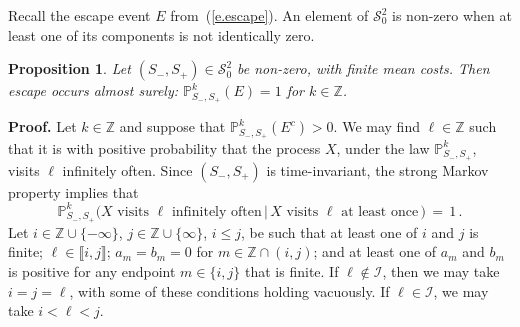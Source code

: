 \documentclass[letterpaper,11pt,oneside,reqno]{amsbook}
\newcommand{\PP}{\ensuremath{\mathbb{P}}}
\newcommand{\Z}{\ensuremath{\mathbb{Z}}}
\numberwithin{figure}{chapter}
\newtheorem{proposition}[theorem]{Proposition}
\theoremstyle{definition}
\theoremstyle{definition}
\theoremstyle{definition}
\theoremstyle{definition}
\theoremstyle{definition}
\newcommand{\mc}{\mathcal}
\newcommand{\tis}{\mc{S}_0}
\newcommand\pgameplay[3]{\PP^{#3}_{#1,#2}}
\begin{document}
Recall the escape event $E$ from~(\ref{e.escape}). An element of $\mc{S}_0^2$ is non-zero when at least one of its components is not identically zero. 
\begin{proposition}\label{p.fmc}
Let $(S_-,S_+) \in \tis^2$ be non-zero, with finite mean costs.
Then escape occurs almost surely: 
$\pgameplay{S_-}{S_+}{k}(E)=1$
 for $k \in \Z$.
\end{proposition}
{\bf Proof.} Let $k \in \Z$ and suppose that 
$\pgameplay{S_-}{S_+}{k}(E^c)>0$. 
We may find $\ell \in \Z$ such that it is with positive probability that the process $X$, under the law 
$\pgameplay{S_-}{S_+}{k}$, 
visits $\ell$ infinitely often. Since $(S_-,S_+)$ is time-invariant, the strong Markov property implies that
\begin{equation}\label{e.infinitelyoften}
\pgameplay{S_-}{S_+}{k} \Big(  \textrm{$X$ visits $\ell$ infinitely often} \, \Big\vert \,  \textrm{$X$ visits $\ell$ at least once} \, \Big) \, = \, 1 \, .
\end{equation}
Let $i \in \Z \cup \{ - \infty \}$, $j \in \Z \cup \{ \infty\}$, $i \leq j$, be such that at least one of $i$ and $j$ is finite; 
 $\ell \in \llbracket i,j \rrbracket$; $a_m = b_m = 0$ for $m \in \Z \cap (i,j)$; and at least one of $a_m$ and $b_m$ is positive for any endpoint $m \in \{ i,j \}$ that is finite.
 If $\ell \not\in \mc{I}$, then we may take  $i=j=\ell$, with 
  some of these conditions holding vacuously. 
  If $\ell \in \mc{I}$, we may take $i < \ell < j$.
\end{document}
